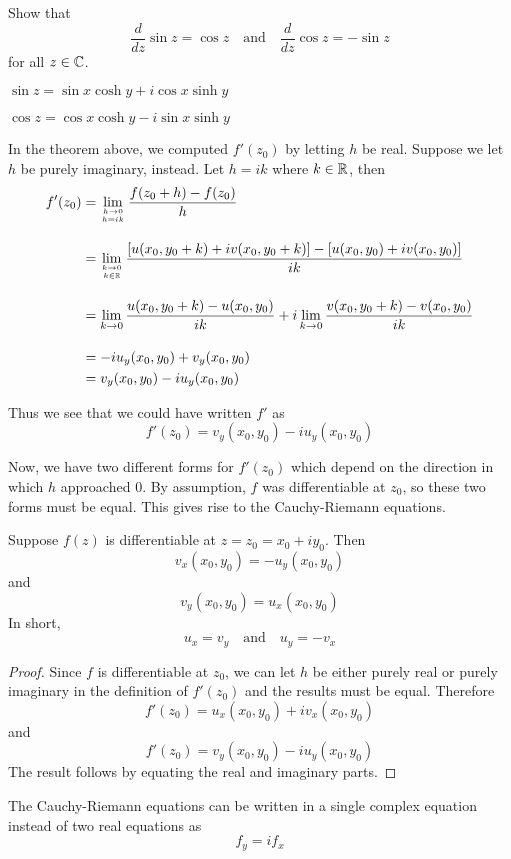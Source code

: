 \documentclass[handout]{ximera}
\begin{document}
\begin{problem}
Show that
\[
\frac{d}{dz} \sin z = \cos z \quad \mbox{and} \quad \frac{d}{dz} \cos z = -\sin z
\]
for all $z \in \mathbb C$.
\begin{hint}
$\sin z = \sin x \cosh y + i \cos x \sinh y$
\end{hint}
\begin{hint}
$\cos z = \cos x \cosh y - i \sin x \sinh y$
\end{hint}
\end{problem}


In the theorem above, we computed $f'(z_0)$ by letting $h$ be real.  Suppose we let $h$ be purely imaginary, instead.
Let $h = ik$ where $k \in \mathbb R$, then
\begin{align*}
f'(z_0) &= \lim_{h \to 0 \atop h = ik} \frac{f(z_0 + h) -f(z_0)}{h} \\[10pt]
        &= \lim_{k \to 0 \atop k \in \mathbb R} \frac{\left[u(x_0 , y_0+k) + iv(x_0 , y_0+k)\right] - \left[u(x_0,y_0)+iv(x_0, y_0)\right]}{ik} \\[10pt]
        &=  \lim_{k \to 0} \frac{u(x_0 , y_0+k)- u(x_0,y_0)}{ik} +i\lim_{k \to 0}\frac{v(x_0 , y_0+k)-v(x_0, y_0)}{ik} \\[10pt]
        &= -iu_y(x_0,y_0) + v_y(x_0,y_0)\\
        &=  v_y(x_0,y_0)-iu_y(x_0,y_0)
\end{align*}

Thus we see that we could have written $f'$ as
\[
f'(z_0) = v_y(x_0,y_0)-iu_y(x_0,y_0)
\]

Now, we have two different forms for $f'(z_0)$ which depend on the direction in which $h$ approached $0$.
By assumption, $f$ was differentiable at $z_0$, so these two forms must be equal. This gives rise to the Cauchy-Riemann equations.


\begin{theorem}
Suppose $f(z)$ is differentiable at $z = z_0 = x_0 +iy_0$. Then
\[
v_x(x_0,y_0)= -u_y(x_0,y_0) 
\]
and 
\[
v_y(x_0,y_0) = u_x(x_0,y_0)
\]
In short, 
\[
u_x =v_y \quad \mbox{and} \quad u_y = -v_x
\]
\end{theorem}


\begin{proof}
Since $f$ is differentiable at $z_0$, we can let $h$ be either purely real or purely imaginary in the definition of $f'(z_0)$
and the results must be equal. Therefore
\[
f'(z_0) = u_x(x_0,y_0)+iv_x(x_0,y_0)
\]
and
\[
f'(z_0) = v_y(x_0,y_0)-iu_y(x_0,y_0)
\]
The result follows by equating the real and imaginary parts.
\end{proof}
\begin{remark}
The Cauchy-Riemann equations can be written in a single complex equation instead of two real equations as
\[
f_y = if_x
\]
\end{remark}
\end{document}

